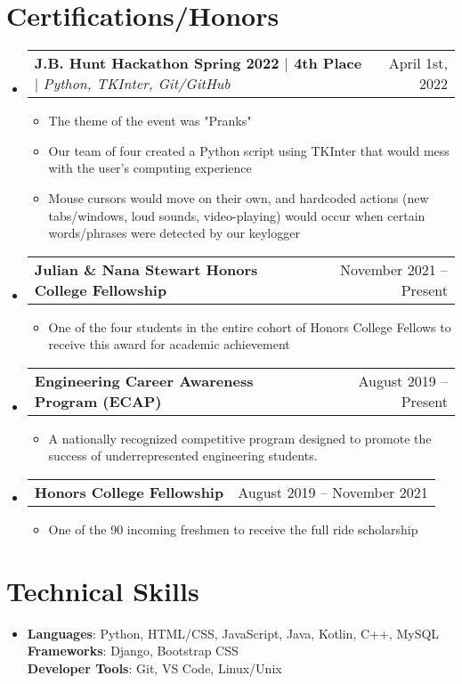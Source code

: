 \documentclass[letterpaper,11pt]{article}
\makeatletter
\newcommand{\resumeItem}[1]{
  \item\small{
    {#1 \vspace{-2pt}}
  }
}
\newcommand{\resumeProjectHeading}[2]{
    \item
    \begin{tabular*}{0.97\textwidth}{l@{\extracolsep{\fill}}r}
      \small#1 & #2 \\
    \end{tabular*}\vspace{-7pt}
}
\newcommand{\resumeItemListStart}{\begin{itemize}}
\newcommand{\resumeItemListEnd}{\end{itemize}\vspace{-5pt}}
\makeatother
\begin{document}
\section{Certifications/Honors}
\begin{itemize}[leftmargin=0.15in, label={}]
  \small
    \resumeProjectHeading
      {\textbf{J.B. Hunt Hackathon Spring 2022 $\mid$ 4th Place} $\mid$ \emph{Python, TKInter, Git/GitHub}}{April 1st, 2022}
        \resumeItemListStart
            \resumeItem{The theme of the event was "Pranks"}
            \resumeItem{Our team of four created a Python script using TKInter that would mess with the user's computing experience}
            \resumeItem{Mouse cursors would move on their own, and hardcoded actions (new tabs/windows, loud sounds, video-playing) would occur when certain words/phrases were detected by our keylogger}
        \resumeItemListEnd
    \resumeProjectHeading
      {\textbf{Julian \& Nana Stewart Honors College Fellowship}}{November 2021 -- Present}
        \resumeItemListStart
            \resumeItem{One of the four students in the entire cohort of Honors College Fellows to receive this award for academic achievement}
        \resumeItemListEnd
    \resumeProjectHeading
      {\textbf{Engineering Career Awareness Program (ECAP)}}{August 2019 -- Present}
        \resumeItemListStart
            \resumeItem{A nationally recognized competitive program designed to promote the success of underrepresented engineering students.}
        \resumeItemListEnd
    \resumeProjectHeading
      {\textbf{Honors College Fellowship}}{August 2019 -- November 2021}
        \resumeItemListStart
            \resumeItem{One of the 90 incoming freshmen to receive the full ride scholarship}
        \resumeItemListEnd
\end{itemize}

\section{Technical Skills}
 \begin{itemize}[leftmargin=0.15in, label={}]
    \item{\small
     \textbf{Languages}{: Python, HTML/CSS, JavaScript, Java, Kotlin, C++, MySQL} \\
     \textbf{Frameworks}{: Django, Bootstrap CSS} \\
     \textbf{Developer Tools}{: Git, VS Code, Linux/Unix} \\
    }
 \end{itemize}
\end{document}
